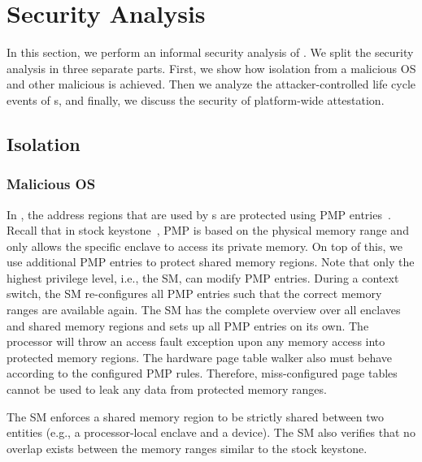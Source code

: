 \section{Security Analysis}
\label{sec:securityAnalysis}

In this section, we perform an informal security analysis of \name. We split the security analysis in three separate parts. First, we show how isolation from a malicious OS and other malicious \sphw is achieved. Then we analyze the attacker-controlled life cycle events of \nameenclave{}s, and finally, we discuss the security of platform-wide attestation. 

\subsection{Isolation}

\subsubsection{Malicious OS}

In \name{}, the address regions that are used by \nameenclave{}s are protected using PMP entries~\cite{riscv2019privspec}. 
Recall that in stock keystone~\cite{keystone}, PMP is based on the physical memory range and only allows the specific enclave to access its private memory. On top of this, we use additional PMP entries to protect shared memory regions. 
Note that only the highest privilege level, i.e., the SM, can modify PMP entries. During a context switch, the SM re-configures all PMP entries such that the correct memory ranges are available again. The SM has the complete overview over all enclaves and shared memory regions and sets up all PMP entries on its own. The processor will throw an access fault exception upon any memory access into protected memory regions. The hardware page table walker also must behave according to the configured PMP rules. Therefore, miss-configured page tables cannot be used to leak any data from protected memory ranges.

The SM enforces a shared memory region to be strictly shared between two entities (e.g., a processor-local enclave and a \sphw device). The SM also verifies that no overlap exists between the memory ranges similar to the stock keystone. 

